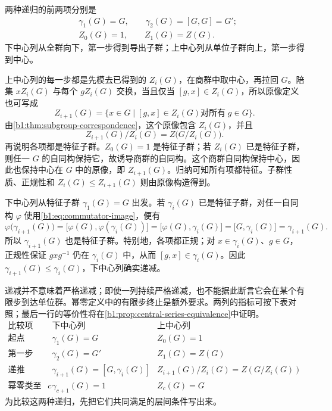 两种递归的前两项分别是
\[
	\begin{aligned}
		&\gamma_1(G)=G,\qquad \gamma_2(G)=[G,G]=G';\\
		&Z_0(G)=1,\qquad Z_1(G)=Z(G).
	\end{aligned}
\]
下中心列从全群向下，第一步得到导出子群；上中心列从单位子群向上，第一步得到中心。

\ProseParagraphBreak
上中心列的每一步都是先模去已得到的 \(Z_i(G)\)，在商群中取中心，再拉回 \(G\)。陪集 \(xZ_i(G)\) 与每个 \(gZ_i(G)\) 交换，当且仅当 \([g,x]\in Z_i(G)\)，所以原像定义也可写成
\[
	Z_{i+1}(G)=\bigl\{x\in G\mid [g,x]\in Z_i(G) \text{对所有}\;g\in G\bigr\}.
\]
由\cref{b1:thm:subgroup-correspondence}，这个原像包含 \(Z_i(G)\)，并且
\begin{equation}\label{b1:eq:upper-central-quotient}
	Z_{i+1}(G)/Z_i(G)=Z\bigl(G/Z_i(G)\bigr).
\end{equation}
再说明各项都是特征子群。\(Z_0(G)=1\) 是特征子群；若 \(Z_i(G)\) 已是特征子群，则任一 \(G\) 的自同构保持它，故诱导商群的自同构。这个商群自同构保持中心，因此也保持中心在 \(G\) 中的原像，即 \(Z_{i+1}(G)\)。归纳可知所有项都特征。子群性质、正规性和 \(Z_i(G)\le Z_{i+1}(G)\) 则由原像构造得到。

\ProseParagraphBreak
下中心列从特征子群 \(\gamma_1(G)=G\) 出发。若 \(\gamma_i(G)\) 已是特征子群，对任一自同构 \(\varphi\) 使用\eqref{b1:eq:commutator-image}，便有
\[
	\varphi\bigl(\gamma_{i+1}(G)\bigr) =\bigl[\varphi(G),\varphi(\gamma_i(G))\bigr] =\bigl[\varphi(G),\gamma_i(G)\bigr] =\bigl[G,\gamma_i(G)\bigr] =\gamma_{i+1}(G).
\]
所以 \(\gamma_{i+1}(G)\) 也是特征子群。特别地，各项都正规；对 \(x\in\gamma_i(G)\)、\(g\in G\)，正规性保证 \(gxg^{-1}\) 仍在 \(\gamma_i(G)\) 中，从而 \([g,x]\in\gamma_i(G)\)。因此 \(\gamma_{i+1}(G)\le\gamma_i(G)\)，下中心列确实递减。

\ProseParagraphBreak
递减并不意味着严格递减；即使一列持续严格递减，也不能据此断言它会在某个有限步到达单位群。幂零定义中的有限步终止是额外要求。两列的指标可按下表对照；最后一行的等价性将在\cref{b1:prop:central-series-equivalence}中证明。
\[
	\begin{array}{c|c|c}
		\text{比较项}&\text{下中心列}&\text{上中心列}\\ \hline \text{起点}&\gamma_1(G)=G&Z_0(G)=1\\
		\text{第一步}&\gamma_2(G)=G'&Z_1(G)=Z(G)\\
		\text{递推}&\gamma_{i+1}(G)=[G,\gamma_i(G)]&Z_{i+1}(G)/Z_i(G)=Z(G/Z_i(G))\\
		\text{幂零类至多}\;c&\gamma_{c+1}(G)=1&Z_c(G)=G
	\end{array}
\]
为比较这两种递归，先把它们共同满足的层间条件写出来。

